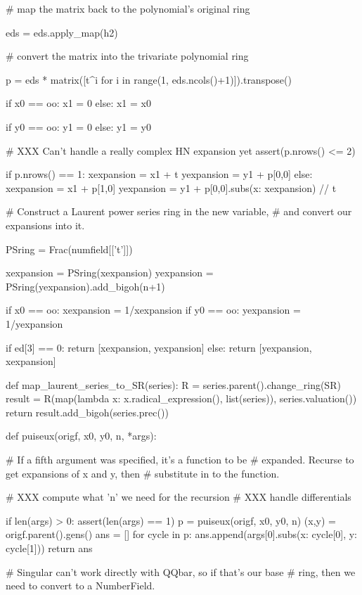 \begin{sagecommonsmall}
    # map the matrix back to the polynomial's original ring

    eds = eds.apply_map(h2)

    # convert the matrix into the trivariate polynomial ring

    p = eds * matrix([t^i for i in range(1, eds.ncols()+1)]).transpose()

    if x0 == oo:
        x1 = 0
    else:
        x1 = x0

    if y0 == oo:
        y1 = 0
    else:
        y1 = y0

    # XXX Can't handle a really complex HN expansion yet
    assert(p.nrows() <= 2)

    if p.nrows() == 1:
        xexpansion = x1 + t
        yexpansion = y1 + p[0,0]
    else:
        xexpansion = x1 + p[1,0]
        yexpansion = y1 + p[0,0].subs({x: xexpansion}) // t

    # Construct a Laurent power series ring in the new variable,
    # and convert our expansions into it.

    PSring = Frac(numfield[['t']])

    xexpansion = PSring(xexpansion)
    yexpansion = PSring(yexpansion).add_bigoh(n+1)

    if x0 == oo:
        xexpansion = 1/xexpansion
    if y0 == oo:
        yexpansion = 1/yexpansion

    if ed[3] == 0:
        return [xexpansion, yexpansion]
    else:
        return [yexpansion, xexpansion]

def map_laurent_series_to_SR(series):
    R = series.parent().change_ring(SR)
    result = R(map(lambda x: x.radical_expression(), list(series)), series.valuation())
    return result.add_bigoh(series.prec())

def puiseux(origf, x0, y0, n, *args):

    # If a fifth argument was specified, it's a function to be
    # expanded.  Recurse to get expansions of x and y, then
    # substitute in to the function.

    # XXX compute what 'n' we need for the recursion
    # XXX handle differentials

    if len(args) > 0:
        assert(len(args) == 1)
        p = puiseux(origf, x0, y0, n)
        (x,y) = origf.parent().gens()
        ans = []
        for cycle in p:
           ans.append(args[0].subs({x: cycle[0], y: cycle[1]}))
        return ans

    # Singular can't work directly with QQbar, so if that's our base
    # ring, then we need to convert to a NumberField.


\end{sagecommonsmall}
